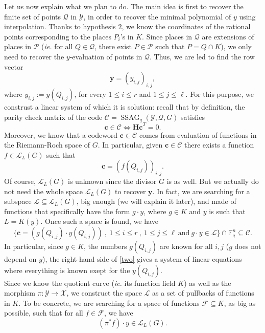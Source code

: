 \documentclass[10pt]{article}
\theoremstyle{definition}
\theoremstyle{definition}
\theoremstyle{definition}
\newcommand{\cd}{\cdot}
\newcommand{\C}{\mathcal{C}}
\newcommand{\Fq}{\mathbb{F}_q}
\newcommand{\su}{\subseteq}
\newcommand{\X}{\mathcal{X}}
\newcommand{\Y}{\mathcal{Y}}
\newcommand{\PR}{\mathcal{P}}
\newcommand{\QR}{\mathcal{Q}}
\newcommand{\ssag}{\operatorname{SSAG}}
\newcommand{\calL}{\mathcal{L}}
\begin{document}
Let us now explain what we plan to do. The main idea is first to recover the finite set of points $\QR$ in $\Y$, in order to recover the minimal polynomial of $y$ using interpolation. Thanks to hypothesis $2$, we know the coordinates of the rational points corresponding to the places $P_i$'s in $K$. Since places in $\QR$ are extensions of places in $\PR$ (\textit{ie.} for all $Q \in \mathcal{Q}$, there exist $P \in \PR$ such that $P=Q\cap K$), we only need to recover the $y$-evaluation of points in $\QR$. Thus, we are led to find the row vector
\begin{equation}
\textbf{y} = (y_{i,j})_{i,j},
\end{equation}
where $y_{i,j} := y(Q_{i,j})$, for every $1 \leq i \leq r$ and $1 \leq j \leq \ell$.
For this purpose, we construst a linear system of which it is solution: recall that by definition, the parity check matrix of the code $\mathcal{C}=\ssag_q(\Y,\QR,G)$ satisfies
\begin{equation} \label{two}
\mathbf{c} \in \mathcal{C} \iff \mathbf{Hc}^T = 0.
\end{equation}
Moreover, we know that a codeword $\mathbf{c} \in \mathcal{C}$ comes from evaluation of functions in the Riemann-Roch space of $G$. In particular, given $\mathbf{c} \in \C$ there exists a function $f \in \calL_L(G)$ such that  
\[\mathbf{c} = (f(Q_{i,j}))_{i,j}.\]
Of course, $\calL_L(G)$ is unknown since the divisor $G$ is as well. But we actually do not need the whole space $\calL_L(G)$ to recover $\mathbf{y}$. In fact, we are searching for a subspace $\mathcal{L} \su \calL_L(G)$, big enough (we will explain it later), and made of functions that specifically have the form $g \cd y$, where $g \in K$ and $y$ is such that $L=K(y)$. Once such a space is found, we have 
\[\{\mathbf{c}= (g(Q_{i,j}) \cd y(Q_{i,j})) \ , \ 1 \leq i \leq r \ , \ 1 \leq j \leq \ell \ \textrm{and} \ g\cd y \in \mathcal{L}\} \cap \Fq^n \su \mathcal{C}.\] 
In particular, since $g \in K$, the numbers $g(Q_{i,j})$ are known for all $i,j$ ($g$ does not depend on $y$), the right-hand side of \eqref{two} gives a system of linear equations where everything is known exept for the $y(Q_{i,j})$. \\
Since we know the quotient curve (\textit{ie.} its function field $K$) as well as the morphism $\pi : \Y \rightarrow \X$, we construct the space $\mathcal{L}$ as a set of pullbacks of functions in $K$. To be concrete, we are searching for a space of functions $\mathcal{F} \su K$, as big as possible, such that for all $f \in \mathcal{F}$, we have
\begin{equation} \label{three}
(\pi^*f) \cd y \in \calL_L(G). 
\end{equation}
\end{document}
